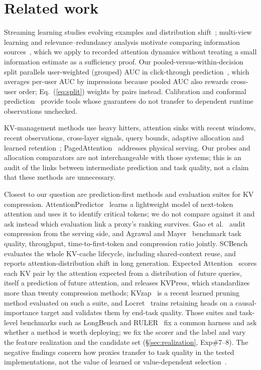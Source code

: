 \section{Related work}
\label{sec:related}
Streaming learning studies evolving examples and distribution
shift~\cite{gama2014drift}; multi-view learning and relevance--redundancy analysis
motivate comparing information sources~\cite{blummitchell,peng2005mrmr}, which we
apply to recorded attention dynamics without treating a small information estimate
as a sufficiency proof. Our pooled-versus-within-decision split parallels
user-weighted (grouped) AUC in click-through prediction~\cite{zhou2018din}, which
averages per-user AUC by impressions because pooled AUC also rewards cross-user order;
Eq.~(\ref{eq:split}) weights by pairs instead.
Calibration and conformal
prediction~\cite{guo2017calibration,angelopoulos2023gentle,gibbs2021aci} provide
tools whose guarantees do not transfer to dependent runtime observations unchecked.

KV-management methods use heavy hitters, attention sinks with recent windows,
recent observations, cross-layer signals, query bounds, adaptive allocation and
learned retention~\cite{h2o,streamingllm,snapkv,quest,infinigen,adakv,pyramidkv,locret};
PagedAttention~\cite{pagedattention} addresses physical serving. Our probes and
allocation comparators are not interchangeable with those systems; this is an audit of
the links between intermediate prediction and task quality, not a claim that these
methods are unnecessary.

Closest to our question are prediction-first methods and evaluation suites for KV
compression. AttentionPredictor~\cite{attentionpredictor} learns a lightweight
model of next-token attention and uses it to identify critical tokens; we do not
compare against it and ask instead which evaluation link a proxy's ranking survives.
Gao et al.~\cite{gao2025rethinking} audit compression from the
serving side, and Agrawal and Mayer~\cite{agrawal2026benchmarking}
benchmark task quality, throughput, time-to-first-token and compression ratio
jointly. SCBench~\cite{scbench} evaluates the whole KV-cache lifecycle, including
shared-context reuse, and reports attention-distribution shift in long generation.
Expected Attention~\cite{kvpress} scores each KV pair by the attention expected from a
distribution of future queries, itself a prediction of future attention, and releases
KVPress, which standardizes more than twenty compression methods;
KVzap~\cite{jegou2026kvzap} is a recent learned pruning method evaluated on such a
suite, and Locret~\cite{locret} trains retaining heads on a causal-importance target
and validates them by end-task quality. Those suites and task-level benchmarks such
as LongBench and RULER~\cite{longbench,ruler} fix a common harness and ask whether a
method is worth deploying; we fix the scorer and the label and vary the feature
realization and the candidate set (\S\ref{sec:realization}, Exp\#7--8). The negative findings concern how proxies
transfer to task quality in the tested implementations, not the value of learned or
value-dependent selection~\cite{vatp}.
